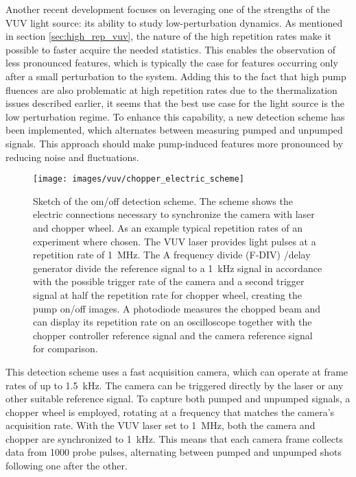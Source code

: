 Another recent development focuses on leveraging one of the strengths of the VUV light source: its ability to study low-perturbation dynamics.
As mentioned in section \ref{sec:high_rep_vuv}, the nature of the high repetition rates make it possible to faster acquire the needed statistics.
This enables the observation of less pronounced features, which is typically the case for features occurring only after a small perturbation to the system.
Adding this to the fact that high pump fluences are also problematic at high repetition rates due to the thermalization issues described earlier, it seems that the best use case for the light source is the low perturbation regime.
To enhance this capability, a new detection scheme has been implemented, which alternates between measuring pumped and unpumped signals.
This approach should make pump-induced features more pronounced by reducing noise and fluctuations.

\begin{figure}
	\centering
	\texttt{[image: images/vuv/chopper\_electric\_scheme]}
	\caption{Sketch of the om/off detection scheme. The scheme shows the electric connections necessary to synchronize the camera with laser and chopper wheel. As an example typical repetition rates of an experiment where chosen. The VUV laser provides light pulses at a repetition rate of \qty{1}{\mega\hertz}. The A frequency divide (F-DIV) /delay generator divide the reference signal to a \qty{1}{\kilo\hertz} signal in  accordance with the possible trigger rate of the camera and a second trigger signal at half the repetition rate for chopper wheel, creating the pump on/off images. A photodiode measures the chopped beam and can display its repetition rate on an oscilloscope together with the chopper controller reference signal and the camera reference signal for comparison.}
	\label{fig:triggerscheme}
\end{figure}

This detection scheme uses a fast acquisition camera, which can operate at frame rates of up to \qty{1.5}{\kilo\hertz}.
The camera can be triggered directly by the laser or any other suitable reference signal.
To capture both pumped and unpumped signals, a chopper wheel is employed, rotating at a frequency that matches the camera's acquisition rate.
With the VUV laser set to \qty{1}{\mega\hertz}, both the camera and chopper are synchronized to \qty{1}{\kilo\hertz}.
This means that each camera frame collects data from 1000 probe pulses, alternating between pumped and unpumped shots following one after the other.

